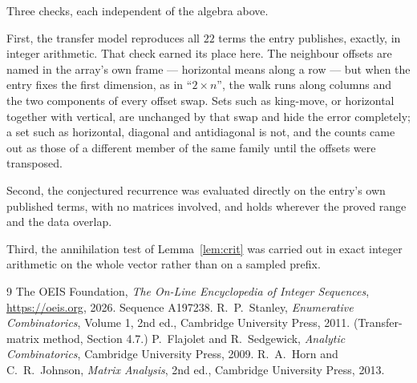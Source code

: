 \documentclass[11pt,a4paper]{article}
\theoremstyle{plain}
\theoremstyle{definition}
\begin{document}
Three checks, each independent of the algebra above.

First, the transfer model reproduces all $22$ terms the entry publishes, exactly, in
integer arithmetic. That check earned its place here. The neighbour offsets are named in the
array's own frame --- horizontal means along a row --- but when the entry fixes the first
dimension, as in ``$2\times n$'', the walk runs along columns and the two components of every
offset swap. Sets such as king-move, or horizontal together with vertical, are unchanged by
that swap and hide the error completely; a set such as horizontal, diagonal and antidiagonal
is not, and the counts came out as those of a different member of the same family until the
offsets were transposed.

Second, the conjectured recurrence was evaluated directly on the entry's own published terms,
with no matrices involved, and holds wherever the proved range and the data overlap.

Third, the annihilation test of Lemma~\ref{lem:crit} was carried out in exact integer
arithmetic on the whole vector rather than on a sampled prefix.

\begin{thebibliography}{9}
 The OEIS Foundation, \emph{The On-Line Encyclopedia of Integer
Sequences}, \url{https://oeis.org}, 2026. Sequence A197238.
 R.~P.~Stanley, \emph{Enumerative Combinatorics}, Volume 1, 2nd ed.,
Cambridge University Press, 2011. (Transfer-matrix method, Section 4.7.)
 P.~Flajolet and R.~Sedgewick, \emph{Analytic Combinatorics}, Cambridge
University Press, 2009.
 R.~A.~Horn and C.~R.~Johnson, \emph{Matrix Analysis}, 2nd ed., Cambridge
University Press, 2013.
\end{thebibliography}
\end{document}
